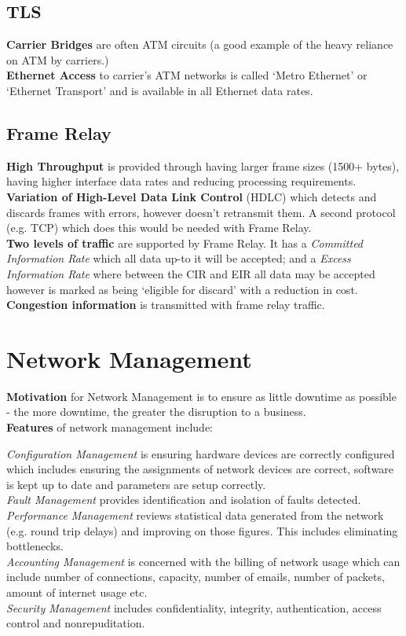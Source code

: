\documentclass[a4paper,11pt]{article}
\begin{document}
\subsection{TLS}
\textbf{Carrier Bridges} are often ATM circuits (a good example of the heavy reliance on ATM by carriers.)\\
\textbf{Ethernet Access} to carrier's ATM networks is called `Metro Ethernet' or `Ethernet Transport' and is available in all Ethernet data rates. 
\subsection{Frame Relay}
\textbf{High Throughput} is provided through having larger frame sizes (1500+ bytes), having higher interface data rates and reducing processing requirements.\\
\textbf{Variation of High-Level Data Link Control} (HDLC) which detects and discards frames with errors, however doesn't retransmit them. A second protocol (e.g. TCP) which does this would be needed with Frame Relay.\\
\textbf{Two levels of traffic} are supported by Frame Relay. It has a \textit{Committed Information Rate} which all data up-to it will be accepted; and a \textit{Excess Information Rate} where between the CIR and EIR all data may be accepted however is marked as being `eligible for discard' with a reduction in cost.\\
\textbf{Congestion information} is transmitted with frame relay traffic. 

\section{Network Management}
\textbf{Motivation} for Network Management is to ensure as little downtime as possible - the more downtime, the greater the disruption to a business.\\
\textbf{Features} of network management include:
\begin{adjustwidth}{2em}{1em}
\textit{Configuration Management} is ensuring hardware devices are correctly configured which includes ensuring the assignments of network devices are correct, software is kept up to date and parameters are setup correctly.\\
\textit{Fault Management} provides identification and isolation of faults detected.\\
\textit{Performance Management} reviews statistical data generated from the network (e.g. round trip delays) and improving on those figures. This includes eliminating bottlenecks.\\
\textit{Accounting Management} is concerned with the billing of network usage which can include number of connections, capacity, number of emails, number of packets, amount of internet usage etc.\\
\textit{Security Management} includes confidentiality, integrity, authentication, access control and nonrepuditation.
\end{adjustwidth}
\end{document}
